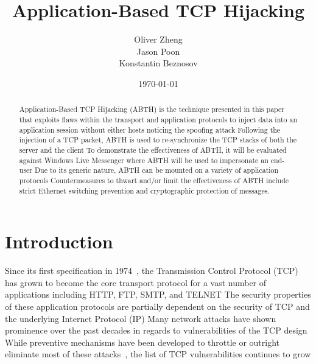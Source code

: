 \documentclass{sig-alternate}
\begin{document}

\title{
Application-Based TCP Hijacking
}

\author {
	\alignauthor
	Oliver Zheng\\
	\alignauthor
	Jason Poon\\
	\alignauthor
	Konstantin Beznosov\\
}

\date{\today}

\maketitle

\begin{abstract}
Application-Based TCP Hijacking (ABTH) is the technique presented in this paper that exploits flaws within the transport and application protocols to inject data into an application session without either hosts noticing the spoofing attack
Following the injection of a TCP packet, ABTH is used to re-synchronize the TCP stacks of both the server and the client
To demonstrate the effectiveness of ABTH, it will be evaluated against Windows Live Messenger where ABTH will be used to impersonate an end-user
Due to its generic nature, ABTH can be mounted on a variety of application protocols
Countermeasures to thwart and/or limit the effectiveness of ABTH include strict Ethernet switching prevention and cryptographic protection of messages.
\end{abstract}



\section{Introduction}

Since its first specification in 1974~\cite{rfc:tcp}, the Transmission Control Protocol (TCP) has grown to become the core transport protocol for a vast number of applications including HTTP, FTP, SMTP, and TELNET
The security properties of these application protocols are partially dependent on the security of TCP and the underlying Internet Protocol (IP)
Many network attacks have shown prominence over the past decades in regards to vulnerabilities of the TCP design~\cite{harris:tcpattacks}
While preventive mechanisms have been developed to throttle or outright eliminate most of these attacks~\cite{dubrawsky:layer2}, the list of TCP vulnerabilities continues to grow
\end{document}
